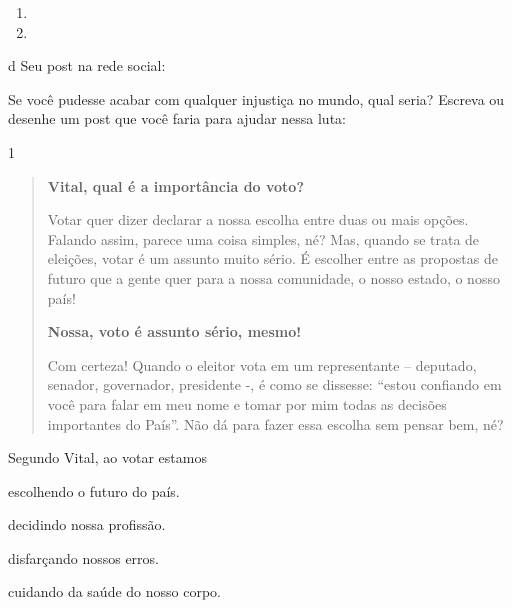 \begin{enumerate}
\item {} 

\item {} 
\end{enumerate}

\num{d} Seu post na rede social:

Se você pudesse acabar com qualquer injustiça no mundo, qual seria?
Escreva ou desenhe um post que você faria para ajudar nessa luta:




\num{1}


\begin{quote}
\textbf{Vital, qual é a importância do voto?}

Votar quer dizer declarar a nossa escolha entre duas ou mais opções.
Falando assim, parece uma coisa simples, né? Mas, quando se trata de
eleições, votar é um assunto muito sério. É escolher entre as propostas
de futuro que a gente quer para a nossa comunidade, o nosso estado, o
nosso país!

\noindent\textbf{Nossa, voto é assunto sério, mesmo!}

Com certeza! Quando o eleitor vota em um representante -- deputado,
senador, governador, presidente -, é como se dissesse: ``estou confiando
em você para falar em meu nome e tomar por mim todas as decisões
importantes do País''. Não dá para fazer essa escolha sem pensar bem,
né?

\end{quote}

Segundo Vital, ao votar estamos

\begin{escolha}
\item escolhendo o futuro do país.

\item decidindo nossa profissão.

\item disfarçando nossos erros.

\item cuidando da saúde do nosso corpo.
\end{escolha}

